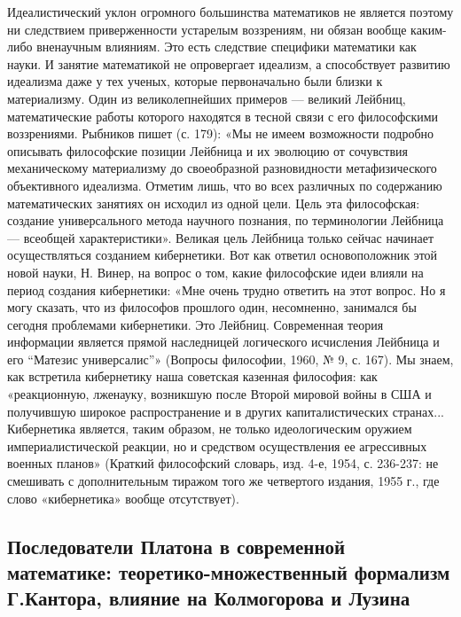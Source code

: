 Идеалистический уклон огромного большинства математиков не является
поэтому ни следствием приверженности устарелым воззрениям, ни обязан
вообще каким-либо вненаучным влияниям. Это есть следствие специфики
математики как науки. И занятие математикой не опровергает идеализм, а
способствует развитию идеализма даже у тех ученых, которые
первоначально были близки к материализму. Один из великолепнейших
примеров --- великий Лейбниц, математические работы которого находятся
в тесной связи с его философскими воззрениями. Рыбников пишет (с.
179): «Мы не имеем возможности подробно описывать философские позиции
Лейбница и их эволюцию от сочувствия механическому материализму до
своеобразной разновидности метафизического объективного идеализма.
Отметим лишь, что во всех различных по содержанию математических
занятиях он исходил из одной цели. Цель эта философская: создание
универсального метода научного познания, по терминологии Лейбница ---
всеобщей характеристики». Великая цель Лейбница только сейчас начинает
осуществляться созданием кибернетики. Вот как ответил основоположник
этой новой науки, Н. Винер, на вопрос о том, какие философские идеи
влияли на период создания кибернетики: «Мне очень трудно ответить на
этот вопрос. Но я могу сказать, что из философов прошлого один,
несомненно, занимался бы сегодня проблемами кибернетики. Это Лейбниц.
Современная теория информации является прямой наследницей логического
исчисления Лейбница и его ``Матезис универсалис''» (Вопросы философии,
1960, № 9, с. 167). Мы знаем, как встретила кибернетику наша советская
казенная философия: как «реакционную, лженауку, возникшую после Второй
мировой войны в США и получившую широкое распространение и в других
капиталистических странах... Кибернетика является, таким образом, не
только идеологическим оружием империалистической реакции, но и
средством осуществления ее агрессивных военных планов» (Краткий
философский словарь, изд. 4-е, 1954, с. 236-237: не смешивать с
дополнительным тиражом того же четвертого издания, 1955 г., где слово
«кибернетика» вообще отсутствует).

\subsection{Последователи Платона в современной математике:
теоретико-множественный формализм Г.Кантора, влияние на Колмогорова и
Лузина}

